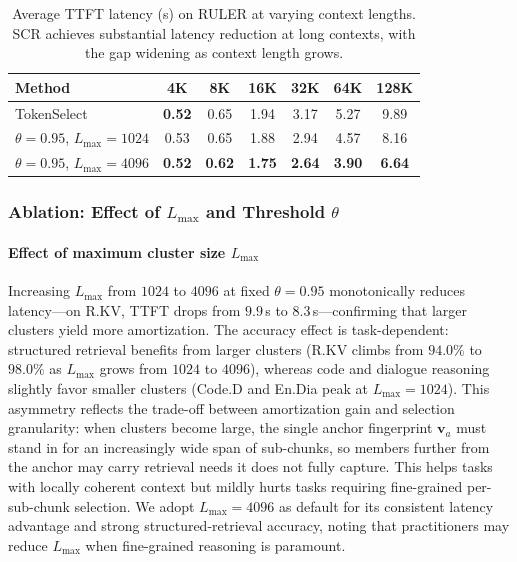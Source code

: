 \documentclass[10pt,conference]{IEEEtran}
\begin{document}
\begin{table}[t]
\centering
\caption{Average TTFT latency (s) on RULER at varying context lengths. 
SCR achieves substantial latency reduction at long contexts, with the 
gap widening as context length grows.}
\label{tab:ruler-latency}
\footnotesize
\setlength{\tabcolsep}{4pt}
\begin{tabular}{lcccccc}
\toprule
\textbf{Method} & \textbf{4K} & \textbf{8K} & \textbf{16K} & \textbf{32K} & \textbf{64K} & \textbf{128K} \\
\midrule
TokenSelect                            & \textbf{0.52} & 0.65 & 1.94 & 3.17 & 5.27 & 9.89 \\
\midrule
$\theta\!=\!0.95$, $L_{\max}\!=\!1024$      & 0.53 & 0.65 & 1.88 & 2.94 & 4.57 & 8.16 \\
$\theta\!=\!0.95$, $L_{\max}\!=\!4096$      & \textbf{0.52} & \textbf{0.62} & \textbf{1.75} & \textbf{2.64} & \textbf{3.90} & \textbf{6.64} \\
\bottomrule
\end{tabular}
\end{table}


\subsubsection{Ablation: Effect of $L_{\max}$ and Threshold $\theta$}
\label{subsec:exp-ablation}

\paragraph{Effect of maximum cluster size $L_{\max}$}
Increasing $L_{\max}$ from $1024$ to $4096$ at fixed $\theta = 0.95$
monotonically reduces latency---on R.KV, TTFT drops
from $9.9$\,s to $8.3$\,s---confirming that larger clusters yield more
amortization. The accuracy effect is task-dependent: structured
retrieval benefits from larger clusters (R.KV
climbs from $94.0\%$ to $98.0\%$ as $L_{\max}$ grows from $1024$ to
$4096$), whereas code and dialogue reasoning slightly favor smaller
clusters (Code.D and En.Dia
peak at $L_{\max} = 1024$). This asymmetry reflects the trade-off
between amortization gain and selection granularity: when clusters
become large, the single anchor fingerprint $\mathbf{v}_a$ must stand
in for an increasingly wide span of sub-chunks, so members further
from the anchor may carry retrieval needs it does not fully capture.
This helps tasks with locally coherent context but mildly hurts tasks
requiring fine-grained per-sub-chunk selection. We adopt $L_{\max} = 4096$ as default for its consistent
latency advantage and strong structured-retrieval accuracy, noting
that practitioners may reduce $L_{\max}$ when fine-grained reasoning
is paramount.
\end{document}
